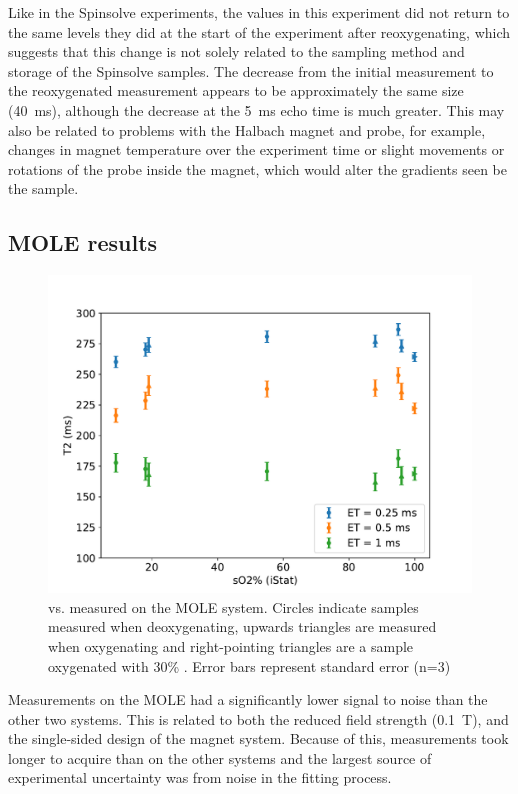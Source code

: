 Like in the Spinsolve experiments, the \Ttwo values in this experiment did not return to the same levels they did at the start of the experiment after reoxygenating, which suggests that this change is not solely related to the sampling method and storage of the Spinsolve samples.
The decrease from the initial \Ttwo measurement to the reoxygenated measurement appears to be approximately the same size (\SI{40}{ms}), although the decrease at the \SI{5}{ms} echo time is much greater.
This may also be related to problems with the Halbach magnet and probe, for example, changes in magnet temperature over the experiment time or slight movements or rotations of the probe inside the magnet, which would alter the gradients seen be the sample.

\subsection{MOLE results}
\begin{figure}[th]
\centering
\includegraphics[width=\textwidth]{figures/stoppedflow/moleT2SO2.pdf}
\caption[Stopped flow \Ttwo vs. \SOtwo measured on the MOLE system]{\Ttwo vs. \SOtwo measured on the MOLE system. Circles indicate samples measured when deoxygenating, upwards triangles are measured when oxygenating and right-pointing triangles are a sample oxygenated with 30\% \Otwo. Error bars represent standard error (n=3)}
\label{fig:sf-moleT2SO2}
\end{figure}
%
Measurements on the MOLE had a significantly lower signal to noise than the other two systems.
This is related to both the reduced field strength (\SI{0.1}{T}), and the single-sided design of the magnet system.
Because of this, measurements took longer to acquire than on the other systems and the largest source of experimental uncertainty was from noise in the fitting process.


